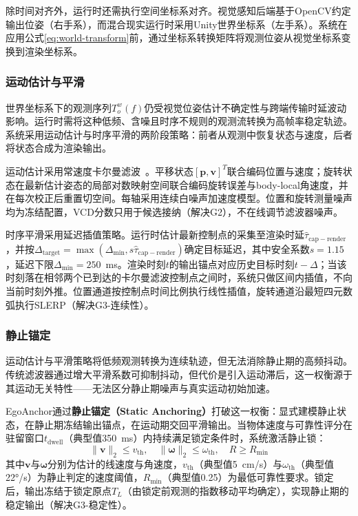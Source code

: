 \documentclass[review]{vgtc}
\begin{document}
除时间对齐外，运行时还需执行空间坐标系对齐。视觉感知后端基于OpenCV约定输出位姿（右手系），而混合现实运行时采用Unity世界坐标系（左手系）。系统在应用公式\ref{eq:world-transform}前，通过坐标系转换矩阵将观测位姿从视觉坐标系变换到渲染坐标系。

\subsubsection{运动估计与平滑}\label{sec:smoothing}

世界坐标系下的观测序列${T_o^w (f)}$仍受视觉位姿估计不确定性与跨端传输时延波动影响。运行时需将这种低频、含噪且时序不规则的观测流转换为高帧率稳定轨迹。系统采用运动估计与时序平滑的两阶段策略：前者从观测中恢复状态与速度，后者将状态合成为渲染输出。

运动估计采用常速度卡尔曼滤波~\cite{kalman1960new}。平移状态$[\mathbf{p},\mathbf{v}]^T$联合编码位置与速度；旋转状态在最新估计姿态的局部对数映射空间联合编码旋转误差与body-local角速度，并在每次校正后重置切空间。每轴采用连续白噪声加速度模型。位置和旋转测量噪声均为冻结配置，VCD分数只用于候选接纳（解决G2），不在线调节滤波器噪声。

时序平滑采用延迟插值策略。运行时估计最新控制点的采集至渲染时延$\widehat{\tau}_{\mathrm{cap-render}}$，并按$\Delta_{\mathrm{target}} = \max(\Delta_{\mathrm{min}}, s \widehat{\tau}_{\mathrm{cap-render}})$确定目标延迟，其中安全系数$s = 1.15$，延迟下限$\Delta_{\mathrm{min}} = 250$~ms。渲染时刻$t$的输出锚点对应历史目标时刻$t - \Delta$；当该时刻落在相邻两个已到达的卡尔曼滤波控制点之间时，系统只做区间内插值，不向当前时刻外推。位置通道按控制点时间比例执行线性插值，旋转通道沿最短四元数弧执行SLERP（解决G3-连续性）。

\subsubsection{静止锚定}\label{sec:staticlock}

运动估计与平滑策略将低频观测转换为连续轨迹，但无法消除静止期的高频抖动。传统滤波器通过增大平滑系数可抑制抖动，但代价是引入运动滞后，这一权衡源于其运动无关特性——无法区分静止期噪声与真实运动初始加速。

EgoAnchor通过\textbf{静止锚定（Static Anchoring）}打破这一权衡：显式建模静止状态，在静止期冻结输出锚点，在运动期交回平滑输出。当物体速度与可靠性评分在驻留窗口$t_{\mathrm{dwell}}$（典型值350~ms）内持续满足锁定条件时，系统激活静止锁：
\begin{equation}
\lVert \mathbf{v} \rVert_2 \leq v_{\mathrm{th}}, \quad \lVert \mathbf{\omega} \rVert_2 \leq \omega_{\mathrm{th}}, \quad R \geq R_{\mathrm{min}}
\end{equation}
其中$\mathbf{v}$与$\mathbf{\omega}$分别为估计的线速度与角速度，$v_{\mathrm{th}}$（典型值5~cm/s）与$\omega_{\mathrm{th}}$（典型值22°/s）为静止判定的速度阈值，$R_{\mathrm{min}}$（典型值0.25）为最低可靠性要求。锁定后，输出冻结于锁定原点$T_L$（由锁定前观测的指数移动平均确定），实现静止期的稳定输出（解决G3-稳定性）。
\end{document}
